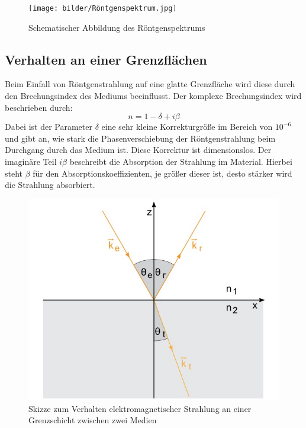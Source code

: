 \begin{figure}
    \texttt{[image: bilder/Röntgenspektrum.jpg]}
    \caption{Schematischer Abbildung des Röntgenspektrums}
    \label{fig:Abbildung 1}
\end{figure}
\cite{Röntgenspektrum}

\subsection{Verhalten an einer Grenzflächen}
Beim Einfall von Röntgenstrahlung auf eine glatte Grenzfläche wird diese durch den Brechungsindex des Mediums beeinflusst.
Der komplexe Brechungsindex wird beschrieben durch:
\begin{equation}
    n=1-\delta+i\beta
\end{equation}
Dabei ist der Parameter \(\delta\) eine sehr kleine Korrekturgröße im Bereich von $10^{-6}$
und gibt an, wie stark die Phasenverschiebung der Röntgenstrahlung beim Durchgang durch das Medium ist.
Diese Korrektur ist dimensionslos. Der imaginäre Teil \(i\beta\) beschreibt die Absorption der Strahlung im Material.
Hierbei steht \(\beta\) für den Absorptionskoeffizienten, je größer dieser ist, desto stärker wird die Strahlung absorbiert.

\begin{figure}
    \includegraphics[width=\textwidth]{bilder/Reflexion.jpg}
    \caption{Skizze zum Verhalten elektromagnetischer Strahlung an einer Grenzschicht zwischen zwei Medien}
    \label{fig:Abbildung 2}
\end{figure}
\cite{Reflexion}

